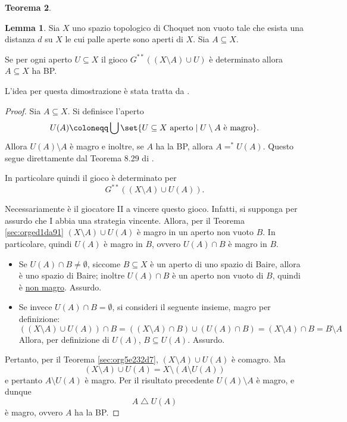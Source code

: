 \documentclass[titlepage]{article}
\newcommand{\1}{\mathds{1}}
\theoremstyle{definition}%
\newtheorem{thm}{Teorema}[section]
\newtheorem{lem}[thm]{Lemma}
\theoremstyle{plain}
\theoremstyle{remark}
\begin{document}
\begin{thm}
\begin{lem}\label{sec:org29f61ee}
Sia \(X\) uno {spazio topologico} {di Choquet} non {vuoto} tale che esista una {distanza} \(d\) su \(X\) le cui {palle aperte} sono aperti di \(X\). Sia \(A \subseteq X\).

Se per ogni aperto \(U \subseteq X\) il {gioco} \(G^{**}\left((X\setminus A)\cup U\right)\) è {determinato} allora \(A \subseteq X\) ha {BP}.
\end{lem}

L'idea per questa dimostrazione è stata tratta da \cite{mathoverflow}.

\begin{proof}
Sia \(A \subseteq X\). Si definisce l'aperto
\begin{equation*}
U(A) \coloneqq \bigcup \set{
U\subseteq X\text{ aperto}\mid U\setminus A\text{ è magro}
}.
\end{equation*}
Allora \(U(A)\setminus A\) è magro e inoltre, se \(A\) ha la BP, allora \(A\mathrel{=^{*}} U(A)\). Questo segue direttamente dal Teorema 8.29 di \cite{kechris}.

In particolare quindi il gioco è determinato  per
\begin{equation*}
G^{**}\left((X\setminus A)\cup U(A)\right).
\end{equation*}

Necessariamente è il giocatore II a vincere questo gioco. Infatti, si supponga per assurdo che I abbia una strategia vincente. Allora, per il Teorema \ref{sec:orged1da91} \((X\setminus A)\cup U(A)\) è magro in un aperto non vuoto \(B\). In particolare, quindi \(U(A)\) è magro in \(B\), ovvero \(U(A)\cap B\) è magro in \(B\).
\begin{itemize}
\item Se \(U(A)\cap B\neq\emptyset\), siccome \(B \subseteq X\) è un aperto di uno spazio di Baire, allora è uno spazio di Baire; inoltre \(U(A)\cap B\) è un aperto non vuoto di \(B\), quindi è \uline{non magro}. Assurdo.
\item Se invece \(U(A)\cap B = \emptyset\), si consideri il seguente insieme, magro per definizione:
\begin{equation*}
  \left((X\setminus A)\cup U(A)\right) \cap B = \left((X\setminus A)\cap B\right) \cup \left(U(A)\cap B\right) = (X\setminus A)\cap B = B\setminus A
\end{equation*}
Allora, per definizione di \(U(A)\), \(B \subseteq U(A)\). Assurdo.
\end{itemize}

Pertanto, per il {Teorema \ref{sec:org5e232d7}}, \((X\setminus A)\cup U(A)\) è comagro. Ma
\begin{equation*}
(X\setminus A)\cup U(A) = X \setminus\left(A\setminus U(A)\right)
\end{equation*}
e pertanto \(A\setminus U(A)\) è magro. Per il risultato precedente \(U(A)\setminus A\) è magro, e dunque
\begin{equation*}
A\mathrel{\triangle}U(A)
\end{equation*}
è magro, ovvero \(A\) ha la BP.
\end{proof}



\end{thm}
\end{document}
